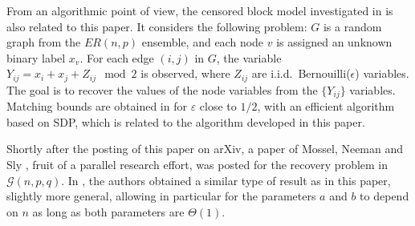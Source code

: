 \documentclass[english]{article}
\newcommand{\eps}{\varepsilon}
\newcommand{\1}{\textbf{1}}
\begin{document}








From an algorithmic point of view, the censored block model investigated in \cite{Abbe_Z2SynchJournal,Abbe_Z2SynchER} is also related to this paper. It considers the following problem: $G$ is a random graph from the $ER(n,p)$ ensemble, and each node $v$ is assigned an unknown binary label $x_v$. For each edge $(i,j)$ in $G$, the variable $Y_{ij}=x_i+x_j+Z_{ij} \mod 2$ is observed, where $Z_{ij}$ are i.i.d.\ Bernouilli($\epsilon$) variables. The goal is to recover the values of the node variables from the $\{Y_{ij}\}$ variables. Matching bounds are obtained in \cite{Abbe_Z2SynchJournal,Abbe_Z2SynchER} for $\eps$ close to $1/2$, with an efficient algorithm based on SDP, which is related to the algorithm developed in this paper. 

Shortly after the posting of this paper on arXiv, a paper of Mossel, Neeman and Sly \cite{mossel-consist}, fruit of a parallel research effort, was posted for the recovery problem in $\mathcal{G}(n,p,q)$. In \cite{mossel-consist}, the authors obtained a similar type of result as in this paper, slightly more general, allowing in particular for the parameters $a$ and $b$ to depend on $n$ as long as both parameters are $\Theta(1)$. 
\end{document}
